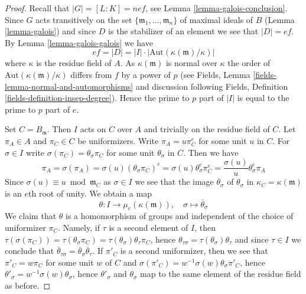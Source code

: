 \begin{proof}
Recall that $|G| = [L : K] = nef$, see Lemma \ref{lemma-galois-conclusion}.
Since $G$ acts transitively on the set
$\{\mathfrak m_1, \ldots, \mathfrak m_n\}$ of maximal ideals of $B$
(Lemma \ref{lemma-galois})
and since $D$ is the stabilizer of an element we see that $|D| = ef$.
By Lemma \ref{lemma-galois-galois} we have
$$
ef = |D| = |I| \cdot |\text{Aut}(\kappa(\mathfrak m)/\kappa)|
$$
where $\kappa$ is the residue field of $A$.
As $\kappa(\mathfrak m)$ is normal over $\kappa$ the order of
$\text{Aut}(\kappa(\mathfrak m)/\kappa)$ differs from $f$ by
a power of $p$ (see
Fields, Lemma \ref{fields-lemma-normal-and-automorphisms}
and discussion following
Fields, Definition \ref{fields-definition-insep-degree}).
Hence the prime to $p$ part
of $|I|$ is equal to the prime to $p$ part of $e$.

\medskip\noindent
Set $C = B_\mathfrak m$. Then $I$ acts on $C$ over $A$ and trivially
on the residue field of $C$. Let $\pi_A \in A$ and $\pi_C \in C$ be
uniformizers. Write $\pi_A = u \pi_C^e$ for some unit $u$ in $C$.
For $\sigma \in I$ write $\sigma(\pi_C) = \theta_\sigma \pi_C$ for some
unit $\theta_\sigma$ in $C$. Then we have
$$
\pi_A = \sigma(\pi_A) = \sigma(u) (\theta_\sigma \pi_C)^e
= \sigma(u) \theta_\sigma^e \pi_C^e = \frac{\sigma(u)}{u} \theta_\sigma^e \pi_A
$$
Since $\sigma(u) \equiv u \bmod \mathfrak m_C$ as $\sigma \in I$
we see that the image $\overline{\theta}_\sigma$
of $\theta_\sigma$ in $\kappa_C = \kappa(\mathfrak m)$
is an $e$th root of unity.
We obtain a map
\begin{equation}
\label{equation-inertia-character}
\theta : I \longrightarrow \mu_e(\kappa(\mathfrak m)),\quad
\sigma \mapsto \overline{\theta}_\sigma
\end{equation}
We claim that $\theta$ is a homomorphism of groups and independent
of the choice of uniformizer $\pi_C$. Namely, if $\tau$ is a second
element of $I$, then
$\tau(\sigma(\pi_C)) = \tau(\theta_\sigma \pi_C) =
\tau(\theta_\sigma) \theta_\tau \pi_C$, hence
$\theta_{\tau \sigma} = \tau(\theta_\sigma) \theta_\tau$ and
since $\tau \in I$ we conclude that
$\overline{\theta}_{\tau \sigma} =
\overline{\theta}_\sigma \overline{\theta}_\tau$.
If $\pi'_C$ is a second uniformizer, then we see
that $\pi'_C = w \pi_C$ for some unit $w$ of $C$ and
$\sigma(\pi'_C) = w^{-1}\sigma(w)\theta_\sigma \pi'_C$,
hence $\theta'_\sigma = w^{-1}\sigma(w)\theta_\sigma$,
hence $\theta'_\sigma$ and $\theta_\sigma$
map to the same element of the residue field as before.


\end{proof}

